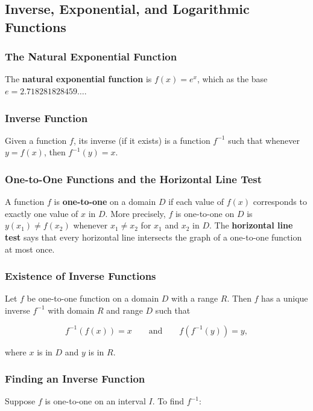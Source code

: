 %
%
%

\subsection{Inverse, Exponential, and Logarithmic Functions}
\subsubsection{The Natural Exponential Function}
The \textbf{natural exponential function} is $f(x) = e^x$, which as the base $e = 2.718281828459\ldots$.

\subsubsection{Inverse Function}
Given a function $f$, its inverse (if it exists) is a function $f^{-1}$ such that whenever $y = f(x)$, then $f^{-1}(y) = x$.

\subsubsection{One-to-One Functions and the Horizontal Line Test}
A function $f$ is \textbf{one-to-one} on a domain $D$ if each value of $f(x)$ corresponds to exactly one value of $x$ in $D$. More precisely, $f$ is one-to-one on $D$ is $y(x_1) \neq f(x_2)$ whenever $x_1 \neq x_2$ for $x_1$ and $x_2$ in $D$. The \textbf{horizontal line test} says that every horizontal line intersects the graph of a one-to-one function at most once.

\subsubsection{Existence of Inverse Functions}
Let $f$ be one-to-one function on a domain $D$ with a range $R$. Then $f$ has a unique inverse $f^{-1}$ with domain $R$ and range $D$ such that

\begin{equation*}
    f^{-1}(f(x)) = x \qquad \text{and} \qquad f(f^{-1}(y)) = y,
\end{equation*}

\noindent where $x$ is in $D$ and $y$ is in $R$.

\subsubsection{Finding an Inverse Function}
Suppose $f$ is one-to-one on an interval $I$. To find $f^{-1}$:

